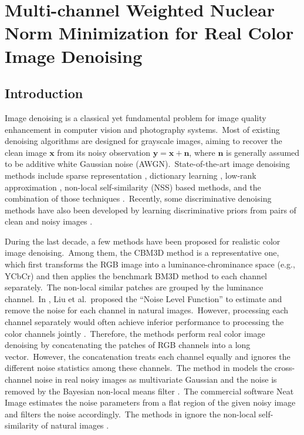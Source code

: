 %
\chapter{Multi-channel Weighted Nuclear Norm Minimization for Real Color Image Denoising}
\label{sec:internallr}

\section{Introduction}

Image denoising is a classical yet fundamental problem for image quality enhancement in computer vision and photography systems.\ Most of existing denoising algorithms are designed for grayscale images, aiming to recover the clean image $\mathbf{x}$ from its noisy observation $\mathbf{y}=\mathbf{x}+\mathbf{n}$, where $\mathbf{n}$ is generally assumed to be additive white Gaussian noise (AWGN).\ State-of-the-art image denoising methods include sparse representation \cite{bm3d}, dictionary learning \cite{ksvd}, low-rank approximation \cite{wnnm}, non-local self-similarity (NSS) \cite{nlm} based methods, and the combination of those techniques \cite{ksvd,bm3d,lssc,epll,ncsr,pgpd,wnnm}.\ Recently, some discriminative denoising methods have also been developed by learning discriminative priors from pairs of clean and noisy images \cite{mlp,csf,tnrd,dncnn}. 

During the last decade, a few methods have been proposed for realistic color image denoising.\ Among them, the CBM3D method \cite{cbm3d} is a representative one, which first transforms the RGB image into a luminance-chrominance space (e.g., YCbCr) and then applies the benchmark BM3D method \cite{bm3d} to each channel separately.\ The non-local similar patches are grouped by the luminance channel.\ In \cite{Liu2008}, Liu et al.\ proposed the ``Noise Level Function'' to estimate and remove the noise for each channel in natural images.\ However, processing each channel separately would often achieve inferior performance to processing the color channels jointly \cite{mairal2008sparse}.\ Therefore, the methods \cite{noiseclinic,ncwebsite,Zhu_2016_CVPR} perform real color image denoising by concatenating the patches of RGB channels into a long vector.\ However, the concatenation treats each channel equally and ignores the different noise statistics among these channels.\ The method in \cite{crosschannel2016} models the cross-channel noise in real noisy images as multivariate Gaussian and the noise is removed by the Bayesian non-local means filter \cite{kervrann2007bayesian}.\ The commercial software Neat Image \cite{neatimage} estimates the noise parameters from a flat region of the given noisy image and filters the noise accordingly.\ The methods in \cite{crosschannel2016,neatimage} ignore the non-local self-similarity of natural images \cite{bm3d,wnnm}. 

